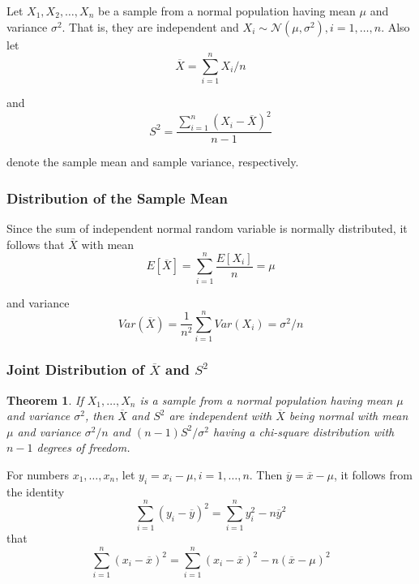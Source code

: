 \documentclass[12pt]{article}
\newtheorem{theorem}{Theorem}
\begin{document}
Let $X_1, X_2, \dots, X_n$ be a sample from a normal population having mean $\mu$ and variance $\sigma^2$. That is, they are independent and $X_i \sim \mathcal{N}(\mu, \sigma^2), i=1,\dots,n$. Also let
\begin{equation*}
  \overline{X} = \sum_{i=1}^n X_i / n
\end{equation*}

and
\begin{equation*}
  S^2 = \frac {\sum_{i=1}^n (X_i - \overline{X})^2}{n-1}
\end{equation*}

denote the sample mean and sample variance, respectively.

\subsubsection{Distribution of the Sample Mean}

Since the sum of independent normal random variable is normally distributed, it follows that $\overline{X}$ with mean
\begin{equation*}
  E[\overline{X}] = \sum_{i=1}^n \frac {E[X_i]}{n} = \mu
\end{equation*}

and variance
\begin{equation*}
  Var(\overline{X}) = \frac{1}{n^2} \sum_{i=1}^n Var(X_i) = \sigma^2 / n
\end{equation*}

\subsubsection{Joint Distribution of $\overline{X}$ and $S^2$}

\begin{theorem} \label{theorem-6.5.1}
  If $X_1, \dots, X_n$ is a sample from a normal population having mean $\mu$ and variance $\sigma^2$, then $\overline{X}$ and $S^2$ are independent with $\overline{X}$ being normal with mean $\mu$ and variance $\sigma^2/n$ and $(n-1)S^2 / \sigma^2$ having a chi-square distribution with $n-1$ degrees of freedom.
\end{theorem}

For numbers $x_1, \dots, x_n$, let $y_i = x_i - \mu, i = 1, \dots, n$. Then $\overline{y} = \overline{x} - \mu$, it follows from the identity
\begin{equation*}
  \sum_{i=1}^n (y_i - \overline{y})^2 = \sum_{i=1}^n y_i^2 - n \overline{y}^2
\end{equation*}
that
\begin{equation*}
  \sum_{i=1}^n (x_i - \overline{x})^2
  = \sum_{i=1}^n (x_i - \overline{x})^2 - n (\overline{x} - \mu)^2
\end{equation*}
\end{document}
